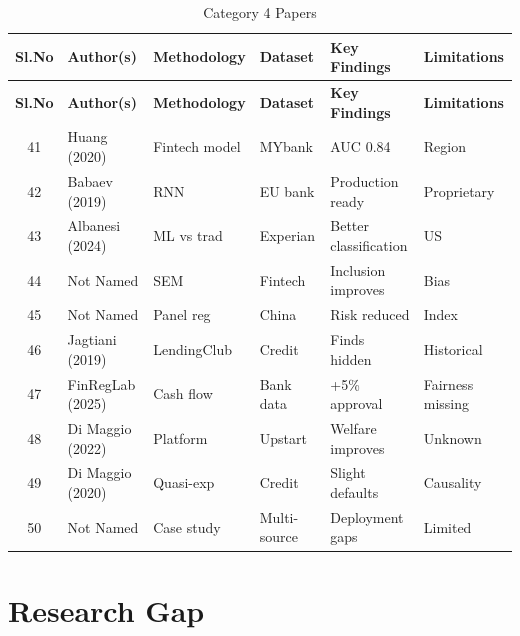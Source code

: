 \begin{longtable}{c p{} p{} p{} p{} p{}}
\caption{Category 4 Papers} \\
\toprule
\textbf{Sl.No} & \textbf{Author(s)} & \textbf{Methodology} & \textbf{Dataset} & \textbf{Key Findings} & \textbf{Limitations} \\
\midrule
\endfirsthead
\toprule
\textbf{Sl.No} & \textbf{Author(s)} & \textbf{Methodology} & \textbf{Dataset} & \textbf{Key Findings} & \textbf{Limitations} \\
\midrule
\endhead

41 & Huang (2020) & Fintech model & MYbank & AUC 0.84 & Region \\
42 & Babaev (2019) & RNN & EU bank & Production ready & Proprietary \\
43 & Albanesi (2024) & ML vs trad & Experian & Better classification & US \\
44 & Not Named & SEM & Fintech & Inclusion improves & Bias \\
45 & Not Named & Panel reg & China & Risk reduced & Index \\
46 & Jagtiani (2019) & LendingClub & Credit & Finds hidden & Historical \\
47 & FinRegLab (2025) & Cash flow & Bank data & +5\% approval & Fairness missing \\
48 & Di Maggio (2022) & Platform & Upstart & Welfare improves & Unknown \\
49 & Di Maggio (2020) & Quasi-exp & Credit & Slight defaults & Causality \\
50 & Not Named & Case study & Multi-source & Deployment gaps & Limited \\
\bottomrule
\end{longtable}

\section{Research Gap}

